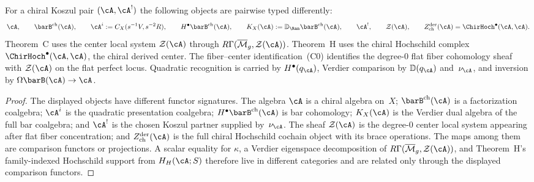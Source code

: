 \begin{proposition}
\label{prop:theorem-c-object-firewall}
For a chiral Koszul pair $(\cA,\cA^!)$ the following objects are
pairwise typed differently:
\[
\cA,\qquad
\barB^{\mathrm{ch}}(\cA),\qquad
\cA^i:=C_X(s^{-1}V,s^{-2}R),\qquad
H^\bullet\barB^{\mathrm{ch}}(\cA),\qquad
K_X(\cA):=\mathbb D_{\Ran}\barB^{\mathrm{ch}}(\cA),\qquad
\cA^!,\qquad
\mathcal{Z}(\cA),\qquad
Z^{\mathrm{der}}_{\mathrm{ch}}(\cA)
=\ChirHoch^\bullet(\cA,\cA).
\]
Theorem~C uses the center local system
$\mathcal{Z}(\cA)$ through
$R\Gamma(\overline{\mathcal{M}}_g,\mathcal{Z}(\cA))$.
Theorem~H uses the chiral Hochschild complex
$\ChirHoch^\bullet(\cA,\cA)$, the chiral derived center.
The fiber--center identification~\textup{(C0)} identifies the
degree-$0$ flat fiber cohomology sheaf with $\mathcal{Z}(\cA)$ on
the flat perfect locus.  Quadratic recognition is carried by
$H^\bullet(q_\cA)$, Verdier comparison by
$\mathbb D(q_\cA)$ and~$\nu_\cA$, and inversion by
$\Omega\barB(\cA)\to\cA$.
\end{proposition}

\begin{proof}
The displayed objects have different functor signatures. The algebra
$\cA$ is a chiral algebra on~$X$; $\barB^{\mathrm{ch}}(\cA)$ is a
factorization coalgebra; $\cA^i$ is the quadratic presentation
coalgebra; $H^\bullet\barB^{\mathrm{ch}}(\cA)$ is bar cohomology;
$K_X(\cA)$ is the Verdier dual algebra of the full bar coalgebra; and
$\cA^!$ is the chosen Koszul partner supplied by~$\nu_\cA$.
The sheaf $\mathcal{Z}(\cA)$ is the degree-$0$
center local system appearing after flat fiber concentration; and
$Z^{\mathrm{der}}_{\mathrm{ch}}(\cA)$ is the full chiral
Hochschild cochain object with its brace operations. The maps
among them are comparison functors or projections. A scalar equality
for $\kappa$, a Verdier eigenspace decomposition of
$R\Gamma(\overline{\mathcal{M}}_g,\mathcal{Z}(\cA))$, and
Theorem~H's family-indexed Hochschild support from $H_H(\cA;S)$
therefore live in different categories and are related only through
the displayed comparison functors.
\end{proof}

